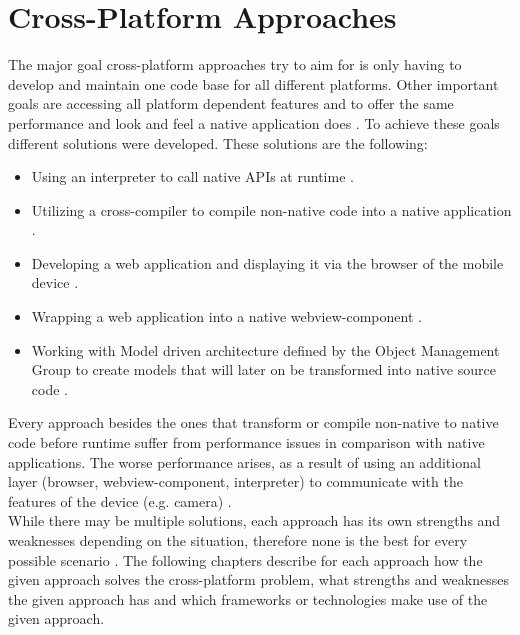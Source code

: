 \documentclass[Bachelor,BIF,english]{twbook}
\begin{document}
\section{Cross-Platform Approaches}
The major goal cross-platform approaches try to aim for is only having to develop and maintain one code base for all different platforms. Other important goals are accessing all platform dependent features and to offer the same performance and look and feel a native application does \cite[p.~1]{7479278} \cite[p.~1]{7934674}. To achieve these goals different solutions were developed. These solutions are the following: 
\begin{itemize}
\item Using an interpreter to call native APIs at runtime \cite[p.~3]{7479278} \cite[p.~4-5]{LinckArne2016} \cite[p.~5-6]{Hansson_Vidhall_2016}.
\item Utilizing a cross-compiler to compile non-native code into a native application \cite[p.~3-4]{7479278} \cite[p.~5]{Hansson_Vidhall_2016}.
\item Developing a web application and displaying it via the browser of the mobile device \cite[p.~2]{7479278} \cite[p.~2-3]{LinckArne2016} \cite[p.~4-5]{Hansson_Vidhall_2016}.
\item Wrapping a web application into a native webview-component \cite[p.~2-3]{7479278} \cite[p.~3-4]{LinckArne2016} \cite[p.~5]{Hansson_Vidhall_2016}.
\item Working with Model driven architecture defined by the Object Management Group to create models that will later on be transformed into native source code \cite[p.~4]{7479278} \cite[p.~3]{7934674}.
\end{itemize}
Every approach besides the ones that transform or compile non-native to native code before runtime suffer from performance issues in comparison with native applications. The worse performance arises, as a result of using an additional layer (browser, webview-component, interpreter) to communicate with the features of the device (e.g. camera) \cite[p.~2,~10]{JohanssonSderberg2018} \cite[p.~5-6]{LinckArne2016} \cite[p.~111]{Keist2016}.
\\[\baselineskip]
While there may be multiple solutions, each approach has its own strengths and weaknesses depending on the situation, therefore none is the best for every possible scenario \cite[p.~110]{Keist2016}. The following chapters describe for each approach how the given approach solves the cross-platform problem, what strengths and weaknesses the given approach has and which frameworks or technologies make use of the given approach.
\end{document}
